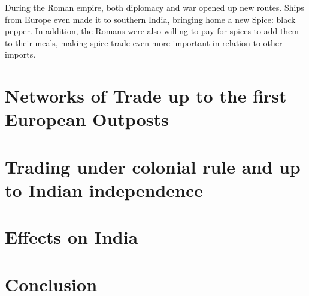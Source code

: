 \documentclass[11pt, a4paper]{scrreprt}
\begin{document}
During the Roman empire, both diplomacy and war opened up new routes. Ships from Europe even made it to southern India, bringing home a new Spice: black pepper. In addition, the Romans were also willing to pay for spices to add them to their meals, making spice trade even more important in relation to other imports.
\chapter{Networks of Trade up to the first European Outposts}
\chapter{Trading under colonial rule and up to Indian independence}
\chapter{Effects on India}
\chapter{Conclusion}
\appendix
\printbibliography
\end{document}
